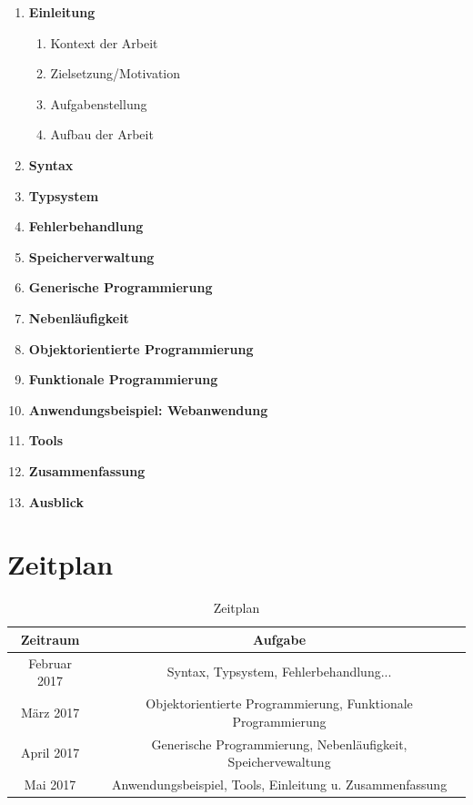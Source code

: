 \documentclass[
    paper=a4,
    bibtotocnumbered,
    liststotocnumbered,
    oneside,
    12pt,
    listof=totoc,
    toc=chapterentrywithdots,
    listof=entryprefix,
]{scrartcl}
\begin{document}
\begin{samepage}
\begin{enumerate}
    \item \textbf{Einleitung}
    \begin{enumerate}
        \item Kontext der Arbeit
        \item Zielsetzung/Motivation
        \item Aufgabenstellung
        \item Aufbau der Arbeit
    \end{enumerate}
    \item \textbf{Syntax}
    \item \textbf{Typsystem}
    \item \textbf{Fehlerbehandlung}
    \item \textbf{Speicherverwaltung}
    \item \textbf{Generische Programmierung}
    \item \textbf{Nebenläufigkeit}
    \item \textbf{Objektorientierte Programmierung}
    \item \textbf{Funktionale Programmierung}
    \item \textbf{Anwendungsbeispiel: Webanwendung}
    \item \textbf{Tools}
    \item \textbf{Zusammenfassung}
    \item \textbf{Ausblick}
\end{enumerate}
\end{samepage}
\newpage

\section{Zeitplan}

\begin{table}[h]
\centering
\begin{tabular}{|c|c|} 
 \hline
 \rowcolor[gray]{0.75} \textbf{Zeitraum} & \textbf{Aufgabe} \\
 \hline
 Februar 2017 & Syntax, Typsystem, Fehlerbehandlung... \\ 
 \hline 
 März 2017 & Objektorientierte Programmierung, Funktionale Programmierung \\
 \hline 
 April 2017 & Generische Programmierung, Nebenläufigkeit, Speichervewaltung \\
 \hline
 Mai 2017 & Anwendungsbeispiel, Tools, Einleitung u. Zusammenfassung \\
 \hline
\end{tabular}
\caption{Zeitplan}
\label{table:zeitplan}
\end{table}
\end{document}
